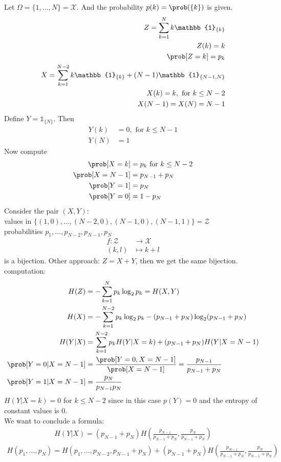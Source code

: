 \documentclass[mfit.tex]{subfiles}
\begin{document}
\begin{ex}
  Let $\Omega = \{1,\dots,N\} = \mathcal{X}$. And the probability $p(k) = \prob(\{k\})$ is given.
  \begin{align*}
    Z = \sum_{k=1}^N k \mathbb{1}_{\{k\}} \\
    Z(k) = k \\
    \prob[Z=k] = p_k \\
    X = \sum_{k=1}^{N-2} k \mathbb{1}_{\{k\}} + (N-1) \mathbb{1}_{\{N-1,N\}} \\
    X(k) = k, \text{ for } k \leq N-2 \\
    X(N-1) = X(N) = N-1
  \end{align*}
  Define $Y = \mathbb{1}_{\{N\}}$.
  Then 
  \begin{align*}
    Y(k) &= 0, \text{ for } k \leq N-1 \\
    Y(N) &= 1
  \end{align*}
  Now compute
  \begin{align*}
    \prob[X=k] &= p_k \text{ for } k \leq N-2 \\
    \prob[X=N-1] &= p_{N-1} + p_N \\
    \prob[Y=1] &= p_N \\
    \prob[Y=0] &= 1 - p_N
  \end{align*}
  Consider the pair $(X,Y)$: \\
  values in $\{(1,0),\dots,(N-2,0),(N-1,0),(N-1,1)\} = \mathcal{Z}$ \\
  probabilities $p_1,\dots,p_{N-2},p_{N-1},p_N$
  \begin{align*}
    f: \mathcal{Z} &\to \mathcal{X} \\
    (k,l) &\mapsto k+l
  \end{align*}
  is a bijection.
  Other approach: $Z = X + Y$, then we get the same bijection.
  computation:
  \begin{align*}
    H(Z) &= - \sum_{k=1}^N p_k \log_2 p_k = H(X,Y) \\
    H(X) &= - \sum_{k=1}^{N-2} p_k \log_2 p_k - (p_{N-1}+p_{N}) \log_2(p_{N-1}+p_{N}) \\
    H(Y|X) &= \sum_{k=1}^{N-2} p_k H(Y|X=k) + (p_{N-1} + p_N) H(Y|X=N-1) \\
    \prob[Y=0|X=N-1] &= \frac{\prob[Y=0,X=N-1]}{\prob[X=N-1]} = \frac{p_{N-1}}{p_{N-1} + p_N} \\
    \prob[Y=1|X=N-1] &= \frac{p_N}{p_{N-1} p_N}
  \end{align*}
  $H(Y|X=k) = 0$ for $k \leq N-2$ since in this case $p(Y) = 0$ and the entropy of constant values is $0$.\\
  We want to conclude a formula:
  \begin{align*}
    H(Y|X) = (p_{N-1} + p_N) H(\frac{p_{N-1}}{p_{N-1} + p_N}, \frac{p_N}{p_{N-1} + p_N})
  \end{align*}
  \begin{align} \label{entropy}
    H(p_1,\dots,p_N) = H(p_1,\dots,p_{N-2}, p_{N-1} +p_N) + (p_{N-1} + p_N) H \left( \frac{p_{N-1}}{p_{N-1} + p_N},\frac{p_N}{p_{N-1} + p_N} \right)
  \end{align}
\end{ex}
\end{document}
